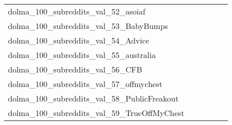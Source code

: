{\begin{longtable}{m{6cm}m{1.7cm}m{1.7cm}m{1.7cm}m{1.7cm}m{1.7cm}}
	dolma\_100\_subreddits\_val\_52\_asoiaf  & \colorbox[HTML]{ffffe5}{\makebox[\mywidth][c]{25.28}} & \colorbox[HTML]{e1f3a9}{\makebox[\mywidth][c]{23.99}} & \colorbox[HTML]{ffffe5}{\makebox[\mywidth][c]{25.63}} & \colorbox[HTML]{d8efa2}{\makebox[\mywidth][c]{23.94}} & \colorbox[HTML]{77c578}{\makebox[\mywidth][c]{23.69}}\\
	dolma\_100\_subreddits\_val\_53\_BabyBumps  & \colorbox[HTML]{ffffe5}{\makebox[\mywidth][c]{20.96}} & \colorbox[HTML]{a0d789}{\makebox[\mywidth][c]{19.82}} & \colorbox[HTML]{ffffe5}{\makebox[\mywidth][c]{21.11}} & \colorbox[HTML]{d4eea0}{\makebox[\mywidth][c]{19.92}} & \colorbox[HTML]{77c578}{\makebox[\mywidth][c]{19.76}}\\
	dolma\_100\_subreddits\_val\_54\_Advice  & \colorbox[HTML]{ffffe5}{\makebox[\mywidth][c]{19.17}} & \colorbox[HTML]{c2e698}{\makebox[\mywidth][c]{18.29}} & \colorbox[HTML]{ffffe5}{\makebox[\mywidth][c]{19.35}} & \colorbox[HTML]{e5f4ab}{\makebox[\mywidth][c]{18.38}} & \colorbox[HTML]{77c578}{\makebox[\mywidth][c]{18.19}}\\
	dolma\_100\_subreddits\_val\_55\_australia  & \colorbox[HTML]{ffffe5}{\makebox[\mywidth][c]{23.97}} & \colorbox[HTML]{b6e092}{\makebox[\mywidth][c]{22.51}} & \colorbox[HTML]{ffffe5}{\makebox[\mywidth][c]{24.06}} & \colorbox[HTML]{d8efa2}{\makebox[\mywidth][c]{22.61}} & \colorbox[HTML]{77c578}{\makebox[\mywidth][c]{22.40}}\\
	dolma\_100\_subreddits\_val\_56\_CFB  & \colorbox[HTML]{ffffe5}{\makebox[\mywidth][c]{20.45}} & \colorbox[HTML]{cdeb9d}{\makebox[\mywidth][c]{19.41}} & \colorbox[HTML]{ffffe5}{\makebox[\mywidth][c]{20.92}} & \colorbox[HTML]{e1f3a9}{\makebox[\mywidth][c]{19.49}} & \colorbox[HTML]{77c578}{\makebox[\mywidth][c]{19.23}}\\
	dolma\_100\_subreddits\_val\_57\_offmychest  & \colorbox[HTML]{ffffe5}{\makebox[\mywidth][c]{19.63}} & \colorbox[HTML]{8ccf81}{\makebox[\mywidth][c]{18.79}} & \colorbox[HTML]{ffffe5}{\makebox[\mywidth][c]{19.77}} & \colorbox[HTML]{e2f3a9}{\makebox[\mywidth][c]{18.93}} & \colorbox[HTML]{77c578}{\makebox[\mywidth][c]{18.77}}\\
	dolma\_100\_subreddits\_val\_58\_PublicFreakout  & \colorbox[HTML]{ffffe5}{\makebox[\mywidth][c]{25.96}} & \colorbox[HTML]{b2df90}{\makebox[\mywidth][c]{24.49}} & \colorbox[HTML]{ffffe5}{\makebox[\mywidth][c]{26.02}} & \colorbox[HTML]{e3f4aa}{\makebox[\mywidth][c]{24.65}} & \colorbox[HTML]{77c578}{\makebox[\mywidth][c]{24.39}}\\
	dolma\_100\_subreddits\_val\_59\_TrueOffMyChest  & \colorbox[HTML]{ffffe5}{\makebox[\mywidth][c]{21.53}} & \colorbox[HTML]{bbe395}{\makebox[\mywidth][c]{20.63}} & \colorbox[HTML]{ffffe5}{\makebox[\mywidth][c]{21.70}} & \colorbox[HTML]{e4f4ab}{\makebox[\mywidth][c]{20.73}} & \colorbox[HTML]{77c578}{\makebox[\mywidth][c]{20.54}}\\

\end{longtable}}
